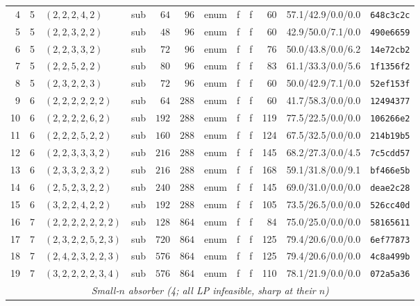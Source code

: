 \documentclass[11pt,a4paper]{article}
\theoremstyle{plain}
\theoremstyle{definition}
\begin{document}
\begin{table}[ht]
\begin{tabular}{r c l l r r l l l r l l}
 4 & 5 & $(2,2,2,4,2)$       & sub & $64$  & $96$  & enum & f & f &  60 & 57.1/42.9/0.0/0.0 & \texttt{648c3c2c}\\
 5 & 5 & $(2,2,3,2,2)$       & sub & $48$  & $96$  & enum & f & f &  60 & 42.9/50.0/7.1/0.0 & \texttt{490e6659}\\
 6 & 5 & $(2,2,3,3,2)$       & sub & $72$  & $96$  & enum & f & f &  76 & 50.0/43.8/0.0/6.2 & \texttt{14e72cb2}\\
 7 & 5 & $(2,2,5,2,2)$       & sub & $80$  & $96$  & enum & f & f &  83 & 61.1/33.3/0.0/5.6 & \texttt{1f1356f2}\\
 8 & 5 & $(2,3,2,2,3)$       & sub & $72$  & $96$  & enum & f & f &  60 & 50.0/42.9/7.1/0.0 & \texttt{52ef153f}\\
 9 & 6 & $(2,2,2,2,2,2)$     & sub & $64$  & $288$ & enum & f & f &  60 & 41.7/58.3/0.0/0.0 & \texttt{12494377}\\
10 & 6 & $(2,2,2,2,6,2)$     & sub & $192$ & $288$ & enum & f & f & 119 & 77.5/22.5/0.0/0.0 & \texttt{106266e2}\\
11 & 6 & $(2,2,2,5,2,2)$     & sub & $160$ & $288$ & enum & f & f & 124 & 67.5/32.5/0.0/0.0 & \texttt{214b19b5}\\
12 & 6 & $(2,2,3,3,3,2)$     & sub & $216$ & $288$ & enum & f & f & 145 & 68.2/27.3/0.0/4.5 & \texttt{7c5cdd57}\\
13 & 6 & $(2,3,3,2,3,2)$     & sub & $216$ & $288$ & enum & f & f & 168 & 59.1/31.8/0.0/9.1 & \texttt{bf466e5b}\\
14 & 6 & $(2,5,2,3,2,2)$     & sub & $240$ & $288$ & enum & f & f & 145 & 69.0/31.0/0.0/0.0 & \texttt{deae2c28}\\
15 & 6 & $(3,2,2,4,2,2)$     & sub & $192$ & $288$ & enum & f & f & 105 & 73.5/26.5/0.0/0.0 & \texttt{526cc40d}\\
16 & 7 & $(2,2,2,2,2,2,2)$   & sub & $128$ & $864$ & enum & f & f &  84 & 75.0/25.0/0.0/0.0 & \texttt{58165611}\\
17 & 7 & $(2,3,2,2,5,2,3)$   & sub & $720$ & $864$ & enum & f & f & 125 & 79.4/20.6/0.0/0.0 & \texttt{6ef77873}\\
18 & 7 & $(2,4,2,3,2,2,3)$   & sub & $576$ & $864$ & enum & f & f & 125 & 79.4/20.6/0.0/0.0 & \texttt{4c8a499b}\\
19 & 7 & $(3,2,2,2,2,3,4)$   & sub & $576$ & $864$ & enum & f & f & 110 & 78.1/21.9/0.0/0.0 & \texttt{072a5a36}\\\midrule
\multicolumn{12}{c}{\emph{Small-$n$ absorber (4; all LP infeasible, sharp at their $n$)}}\\\midrule

\end{tabular}
\end{table}
\end{document}
